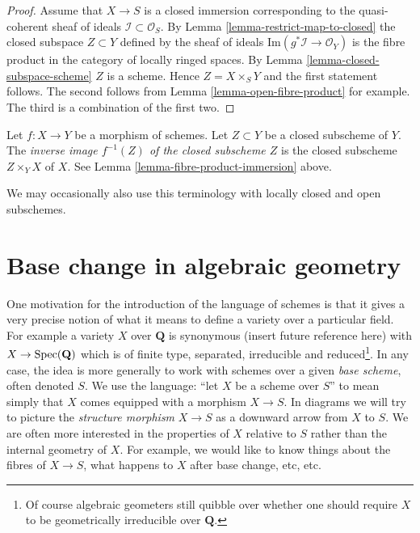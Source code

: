 \begin{proof}
Assume that $X \to S$ is a closed immersion corresponding
to the quasi-coherent sheaf of ideals $\mathcal{I} \subset \mathcal{O}_S$.
By Lemma \ref{lemma-restrict-map-to-closed} the closed subspace
$Z \subset Y$ defined by the sheaf of ideals
$\text{Im}(g^*\mathcal{I} \to \mathcal{O}_Y)$ is the fibre product
in the category of locally ringed spaces.
By Lemma \ref{lemma-closed-subspace-scheme} $Z$ is a scheme.
Hence $Z = X \times_S Y$ and the first statement follows.
The second follows from Lemma \ref{lemma-open-fibre-product}
for example. The third is a combination of
the first two.
\end{proof}

\begin{definition}
\label{definition-inverse-image-closed-subscheme}
Let $f : X \to Y$ be a morphism of schemes. Let $Z \subset Y$ be a
closed subscheme of $Y$. The {\it inverse image $f^{-1}(Z)$ of the
closed subscheme $Z$} is the closed subscheme $Z \times_Y X$ of
$X$. See Lemma \ref{lemma-fibre-product-immersion} above.
\end{definition}

\noindent
We may occasionally also use this terminology with locally closed and
open subschemes.









\section{Base change in algebraic geometry}
\label{section-base-change}

\noindent
One motivation for the introduction of the language of schemes
is that it gives a very precise notion of what it means to
define a variety over a particular field. For example a variety
$X$ over $\mathbf{Q}$ is synonymous (insert future reference here)
with $X \to \mathop{\rm Spec}(\mathbf{Q})$ which is of finite type,
separated, irreducible and reduced\footnote{Of course algebraic
geometers still quibble over whether one should require $X$ to be
geometrically irreducible over $\mathbf{Q}$.}. In any case, the idea
is more generally to work with schemes over a given {\it base scheme},
often denoted $S$. We use the language: ``let $X$ be a scheme over $S$''
to mean simply that $X$ comes equipped with a morphism $X \to S$.
In diagrams we will try to picture the {\it structure morphism}
$X \to S$ as a downward arrow from $X$ to $S$.
We are often more interested in the properties of $X$ relative
to $S$ rather than the internal geometry of $X$.
For example, we would like to know things about the fibres of $X \to S$,
what happens to $X$ after base change, etc, etc.

